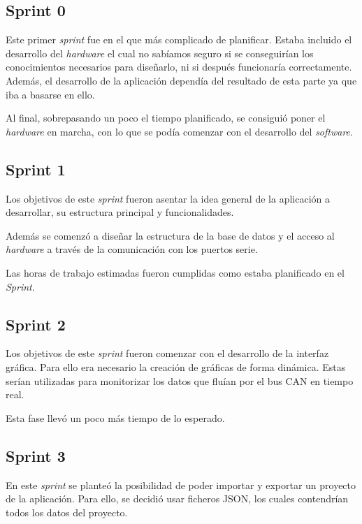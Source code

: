 \subsection{Sprint 0}

Este primer \emph{sprint} fue en el que más complicado de planificar. Estaba incluido el desarrollo del \emph{hardware} el cual no sabíamos seguro si se conseguirían los conocimientos necesarios para diseñarlo, ni si después funcionaría correctamente. Además, el desarrollo de la aplicación dependía del resultado de esta parte ya que iba a basarse en ello.

Al final, sobrepasando un poco el tiempo planificado, se consiguió poner el \emph{hardware} en marcha, con lo que se podía comenzar con el desarrollo del \emph{software}.

\subsection{Sprint 1}

Los objetivos de este \emph{sprint} fueron asentar la idea general de la aplicación a desarrollar, su estructura principal y funcionalidades.

Además se comenzó a diseñar la estructura de la base de datos y el acceso al \emph{hardware} a través de la comunicación con los puertos serie.

Las horas de trabajo estimadas fueron cumplidas como estaba planificado en el \emph{Sprint}.

\subsection{Sprint 2}

Los objetivos de este \emph{sprint} fueron comenzar con el desarrollo de la interfaz gráfica. Para ello era necesario la creación de gráficas de forma dinámica. Estas serían utilizadas para monitorizar los datos que fluían por el bus CAN en tiempo real.

Esta fase llevó un poco más tiempo de lo esperado.


\subsection{Sprint 3}

En este \emph{sprint} se planteó la posibilidad de poder importar y exportar un proyecto de la aplicación. Para ello, se decidió usar ficheros JSON, los cuales contendrían todos los datos del proyecto.

